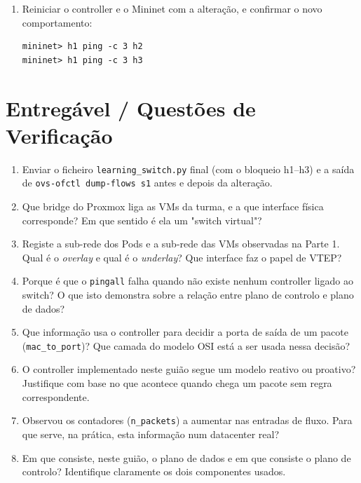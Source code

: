 \documentclass[11pt,a4paper]{article}
\begin{document}
\begin{enumerate}[label=\arabic*.,resume]
  \item Reiniciar o controller e o Mininet com a alteração, e confirmar o novo comportamento:
\begin{lstlisting}
mininet> h1 ping -c 3 h2
mininet> h1 ping -c 3 h3
\end{lstlisting}

\end{enumerate}

\section{Entregável / Questões de Verificação}
\begin{enumerate}[label=\alph*)]
  \setlength\itemsep{0.2cm}
  \item Enviar o ficheiro \texttt{learning\_switch.py} final (com o bloqueio h1--h3) e a saída de \texttt{ovs-ofctl dump-flows s1} antes e depois da alteração.
  \item Que bridge do Proxmox liga as VMs da turma, e a que interface física corresponde? Em que sentido é ela um "switch virtual"?
  \item Registe a sub-rede dos Pods e a sub-rede das VMs observadas na Parte 1. Qual é o \emph{overlay} e qual é o \emph{underlay}? Que interface faz o papel de VTEP?
  \item Porque é que o \texttt{pingall} falha quando não existe nenhum controller ligado ao switch? O que isto demonstra sobre a relação entre plano de controlo e plano de dados?
  \item Que informação usa o controller para decidir a porta de saída de um pacote (\texttt{mac\_to\_port})? Que camada do modelo OSI está a ser usada nessa decisão?
  \item O controller implementado neste guião segue um modelo reativo ou proativo? Justifique com base no que acontece quando chega um pacote sem regra correspondente.
  \item Observou os contadores (\texttt{n\_packets}) a aumentar nas entradas de fluxo. Para que serve, na prática, esta informação num datacenter real?
  \item Em que consiste, neste guião, o plano de dados e em que consiste o plano de controlo? Identifique claramente os dois componentes usados.
\end{enumerate}
\end{document}

